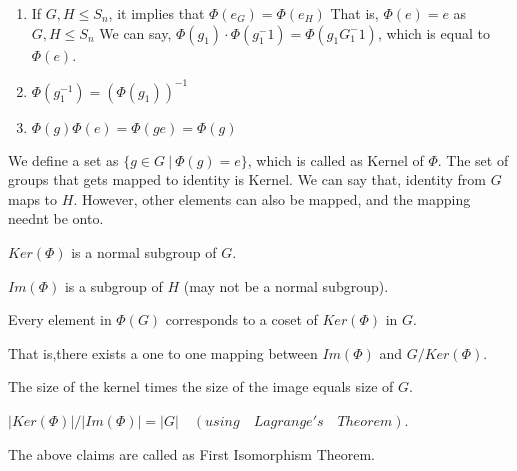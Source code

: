  
 \begin{observation}
 \begin{enumerate}
 \item If $G,H \leqslant S_n$, it implies that $\Phi(e_G)= \Phi(e_H)$
 That is, $\Phi(e)= e$ as $G,H \leqslant S_n$
 We can say, $\Phi(g_1)\cdot\Phi(g_1^-1) = \Phi(g_1G_1^-1)$, which is equal to $\Phi(e)$.
 
 \item $\Phi(g_1^{-1}) = (\Phi(g_1))^{-1}$
 \item $\Phi(g)\Phi(e) = \Phi(ge) = \Phi(g)$

  \end{enumerate}
  \end{observation}
We define a set as $\{g\in G ~|~ \Phi(g)=e\}$, which is called as Kernel of $\Phi$. The set of groups that gets mapped to identity is Kernel.
We can say that, identity from $G$ maps to $H$. However, other elements can also be mapped, and the mapping neednt be onto.

\begin{claim}
$Ker(\Phi)$ is a normal subgroup of $G$.
\end{claim}
\begin{claim}
$Im(\Phi)$ is a subgroup of $H$ (may not be a normal subgroup).
\end{claim}

\begin{claim}
Every element in $\Phi(G)$ corresponds to a coset of $Ker(\Phi)$ in $G$.


That is,there exists a one to one mapping between $Im(\Phi)$ and $G/Ker(\Phi).$
\end{claim}

\begin{claim}
The size of the kernel times the size of the image equals size of $G$.

$|Ker(\Phi)|/|Im(\Phi)|= |G|\quad (using\quad Lagrange's\quad Theorem)$.
\end{claim}

The above claims are called as First Isomorphism Theorem. 
 
 
 
 
 
 
 
 
 
 
 
 



 










 





















